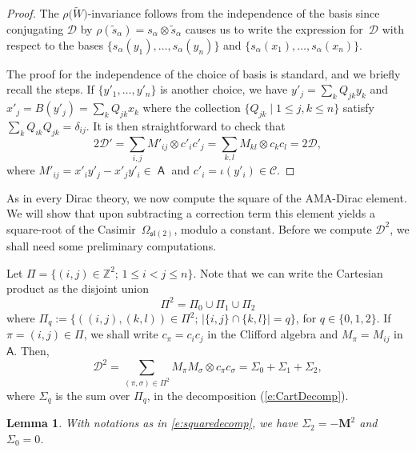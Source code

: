 \documentclass[10pt,a4paper]{amsart}
\numberwithin{equation}{section}
\newtheorem{Lemma}[Theorem]{Lemma}
\newcommand{\Cc}{\mathcal{C}}
\DeclareMathOperator{\ama}{\mathsf{A}}
\begin{document}
\begin{proof}
The $\rho\big(\tilde W\big)$-invariance follows from the independence of the basis since conjugating $\mathcal{D}$ by $\rho(\tilde{s}_\alpha) = s_\alpha\otimes\tilde{s}_\alpha$ causes us to write the expression for~$\mathcal{D}$ with respect to the bases $\{s_\alpha(y_1),\dots,s_\alpha(y_n)\}$ and $\{s_\alpha(x_1),\dots,s_\alpha(x_n)\}$.

The proof for the independence of the choice of basis is standard, and we briefly recall the steps. If $\{y'_1,\dots,y'_n\}$ is another choice, we have $y'_j = \sum_k Q_{jk}y_k$ and $x'_j = B(y'_j) = \sum_k Q_{jk}x_k$ where the collection $\{Q_{jk}\mid 1\leq j,k \leq n\}$ satisfy $\sum_k Q_{ik}Q_{jk} = \delta_{ij}$. It is then straightforward to check that
\[
2\mathcal{D}' = \sum_{i,j}M'_{ij}\otimes c'_ic'_j = \sum_{k,l}M_{kl}\otimes c_kc_l = 2\mathcal{D},
\]
where $M'_{ij} = x'_iy'_j - x'_jy'_i \in \ama$ and $c'_i=\iota(y'_i)\in\Cc$.
\end{proof}

As in every Dirac theory, we now compute the square of the AMA-Dirac element. We will show that upon subtracting a correction term this element yields a square-root of the Casimir~$\Omega_{\mathfrak{sl}(2)}$, modulo a constant. Before we compute $\mathcal{D}^2$, we shall need some preliminary computations.

Let $\Pi = \big\{(i,j)\in \mathbb{Z}^2;\, 1\leq i<j\leq n\big\}$. Note that we can write the Cartesian product as the disjoint union
\begin{equation}\label{e:CartDecomp}
\Pi^2 = \Pi_0 \cup \Pi_1 \cup \Pi_2
\end{equation}
where $\Pi_q := \big\{((i,j),(k,l))\in\Pi^2;\, |\{i,j\}\cap\{k,l\}|=q \big\}$, for $q \in \{0,1,2\}$. If $\pi = (i,j) \in \Pi$, we shall write $c_\pi = c_ic_j$ in the Clifford algebra and $M_\pi = M_{ij}$ in $\mathsf{A}$. Then,
\begin{equation}\label{e:squaredecomp}
\mathcal{D}^2 = \sum_{(\pi,\sigma) \in \Pi^2 } M_\pi M_\sigma \otimes c_\pi c_\sigma = \Sigma_0 + \Sigma_1 + \Sigma_2,
\end{equation}
where $\Sigma_q$ is the sum over $\Pi_q$, in the decomposition (\ref{e:CartDecomp}).

\begin{Lemma}
With notations as in \eqref{e:squaredecomp}, we have $\Sigma_2 = -\mathbf{M}^2$ and $\Sigma_0 = 0$.
\end{Lemma}
\end{document}
